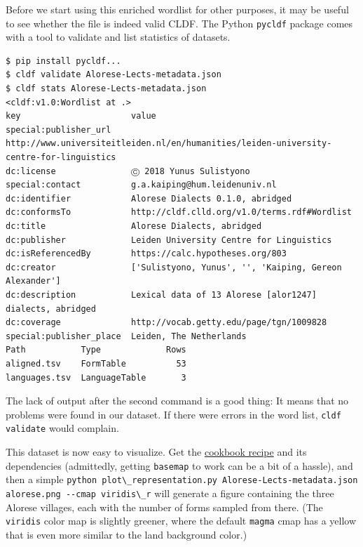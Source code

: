 \documentclass[
  a4paper,
  14pt,
  oneside,
  tablecaptionabove
]{scrbook}
\newcommand{\passthrough}[1]{#1}
\begin{document}
Before we start using this enriched wordlist for other purposes, it may
be useful to see whether the file is indeed valid CLDF. The Python
\passthrough{\lstinline!pycldf!} package comes with a tool to validate
and list statistics of datasets.

\begin{lstlisting}
$ pip install pycldf...
$ cldf validate Alorese-Lects-metadata.json
$ cldf stats Alorese-Lects-metadata.json
<cldf:v1.0:Wordlist at .>
key                      value
special:publisher_url    http://www.universiteitleiden.nl/en/humanities/leiden-university-centre-for-linguistics
dc:license               Ⓒ 2018 Yunus Sulistyono
special:contact          g.a.kaiping@hum.leidenuniv.nl
dc:identifier            Alorese Dialects 0.1.0, abridged
dc:conformsTo            http://cldf.clld.org/v1.0/terms.rdf#Wordlist
dc:title                 Alorese Dialects, abridged
dc:publisher             Leiden University Centre for Linguistics
dc:isReferencedBy        https://calc.hypotheses.org/803
dc:creator               ['Sulistyono, Yunus', '', 'Kaiping, Gereon Alexander']
dc:description           Lexical data of 13 Alorese [alor1247] dialects, abridged
dc:coverage              http://vocab.getty.edu/page/tgn/1009828
special:publisher_place  Leiden, The Netherlands
Path           Type             Rows
aligned.tsv    FormTable          53
languages.tsv  LanguageTable       3
\end{lstlisting}

The lack of output after the second command is a good thing: It means
that no problems were found in our dataset. If there were errors in the
word list, \passthrough{\lstinline!cldf validate!} would complain.

This dataset is now easy to visualize. Get the
\href{https://github.com/cldf/cookbook/tree/master/recipes/plot_representation}{cookbook
recipe} and its dependencies (admittedly, getting
\passthrough{\lstinline!basemap!} to work can be a bit of a hassle), and
then a simple
\passthrough{\lstinline!python plot\_representation.py Alorese-Lects-metadata.json alorese.png --cmap viridis\_r!}
will generate a figure containing the three Alorese villages, each with
the number of forms sampled from there. (The
\passthrough{\lstinline!viridis!} color map is slightly greener, where
the default \passthrough{\lstinline!magma!} cmap has a yellow that is
even more similar to the land background color.)
\end{document}
